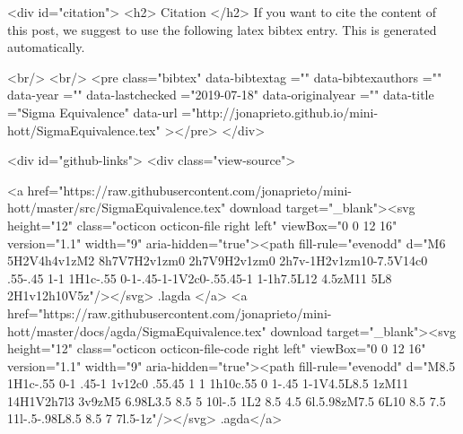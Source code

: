   
  <div id="citation">
  <h2> Citation </h2>
  If you want to cite the content of this post,
  we suggest to use the following latex bibtex entry.
  This is generated automatically.

  <br/>
  <br/>
  <pre class="bibtex"
       data-bibtextag =""
       data-bibtexauthors =""
       data-year =""
       data-lastchecked ="2019-07-18"
       data-originalyear =""
       data-title ="Sigma Equivalence"
       data-url ="http://jonaprieto.github.io/mini-hott/SigmaEquivalence.tex"
  ></pre>
  </div>
  

  <div id="github-links">
    <div class="view-source">
      
        <a href="https://raw.githubusercontent.com/jonaprieto/mini-hott/master/src/SigmaEquivalence.tex" download target="_blank"><svg height="12" class="octicon octicon-file right left" viewBox="0 0 12 16" version="1.1" width="9" aria-hidden="true"><path fill-rule="evenodd" d="M6 5H2V4h4v1zM2 8h7V7H2v1zm0 2h7V9H2v1zm0 2h7v-1H2v1zm10-7.5V14c0 .55-.45 1-1 1H1c-.55 0-1-.45-1-1V2c0-.55.45-1 1-1h7.5L12 4.5zM11 5L8 2H1v12h10V5z"/></svg> .lagda </a>
        <a href="https://raw.githubusercontent.com/jonaprieto/mini-hott/master/docs/agda/SigmaEquivalence.tex" download target="_blank"><svg height="12" class="octicon octicon-file-code right left" viewBox="0 0 12 16" version="1.1" width="9" aria-hidden="true"><path fill-rule="evenodd" d="M8.5 1H1c-.55 0-1 .45-1 1v12c0 .55.45 1 1 1h10c.55 0 1-.45 1-1V4.5L8.5 1zM11 14H1V2h7l3 3v9zM5 6.98L3.5 8.5 5 10l-.5 1L2 8.5 4.5 6l.5.98zM7.5 6L10 8.5 7.5 11l-.5-.98L8.5 8.5 7 7l.5-1z"/></svg> .agda</a>
      
